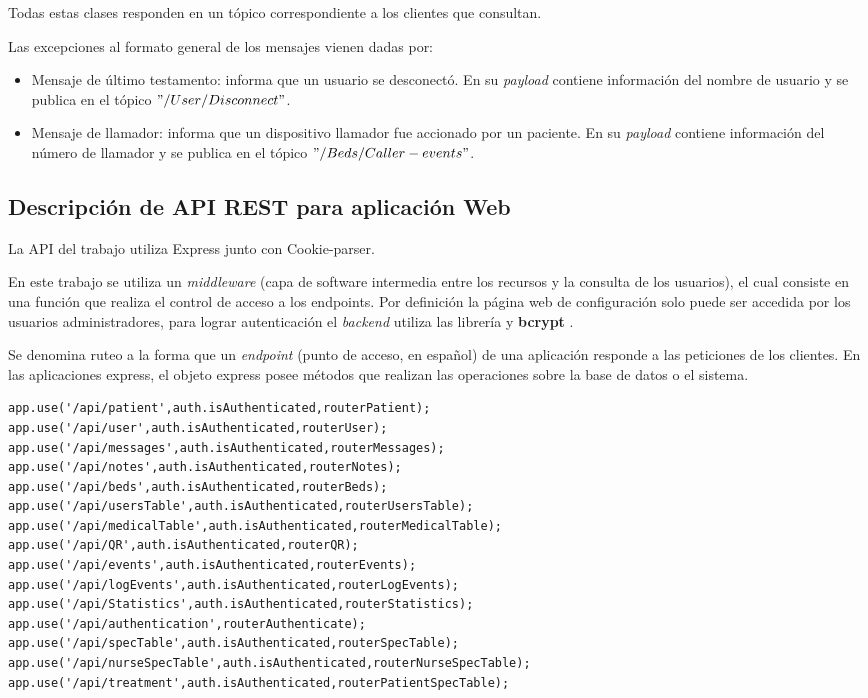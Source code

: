 Todas estas clases responden en un tópico correspondiente a los clientes que consultan.

\pagebreak
Las excepciones al formato general de los mensajes vienen dadas por:
\begin{itemize}
\item Mensaje de último testamento: informa que un usuario se desconectó. En su \textit{payload} contiene información del nombre de usuario y se publica en el tópico $"/User/Disconnect"$.
\item Mensaje de llamador: informa que un dispositivo llamador fue accionado por un paciente. En su \textit{payload} contiene información del número de llamador y se publica en el tópico $"/Beds/Caller-events"$.

\end{itemize}


\pagebreak

\subsection{Descripción de API REST para aplicación Web}

La API del trabajo utiliza Express junto con Cookie-parser. 
 
En este trabajo se utiliza un \textit{middleware} (capa de software intermedia entre los recursos y la consulta de los usuarios), el cual consiste en una función que realiza el control de acceso a los endpoints. Por definición la página web de configuración solo puede ser accedida por los usuarios administradores, para lograr autenticación el \textit{backend} utiliza las librería  \citep{WEBSITE:32} y \textbf{bcrypt} \citep{WEBSITE:31}. 

Se denomina ruteo a la forma que un \textit{endpoint} (punto de acceso, en español) de una aplicación responde a las peticiones de los clientes. En las aplicaciones express, el objeto express posee métodos que realizan las operaciones sobre la base de datos o el sistema.

\begin{lstlisting}[caption=  Rutas express]
app.use('/api/patient',auth.isAuthenticated,routerPatient);
app.use('/api/user',auth.isAuthenticated,routerUser);
app.use('/api/messages',auth.isAuthenticated,routerMessages);
app.use('/api/notes',auth.isAuthenticated,routerNotes);
app.use('/api/beds',auth.isAuthenticated,routerBeds);
app.use('/api/usersTable',auth.isAuthenticated,routerUsersTable);
app.use('/api/medicalTable',auth.isAuthenticated,routerMedicalTable);
app.use('/api/QR',auth.isAuthenticated,routerQR);
app.use('/api/events',auth.isAuthenticated,routerEvents);
app.use('/api/logEvents',auth.isAuthenticated,routerLogEvents);
app.use('/api/Statistics',auth.isAuthenticated,routerStatistics);
app.use('/api/authentication',routerAuthenticate);
app.use('/api/specTable',auth.isAuthenticated,routerSpecTable);
app.use('/api/nurseSpecTable',auth.isAuthenticated,routerNurseSpecTable);
app.use('/api/treatment',auth.isAuthenticated,routerPatientSpecTable);
\end{lstlisting}


